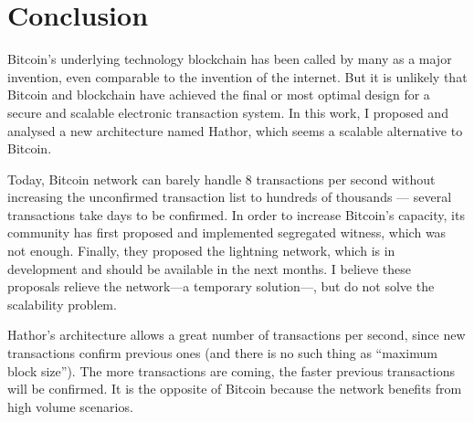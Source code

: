 


\chapter{Conclusion}

Bitcoin's underlying technology blockchain has been called by many as a major invention, even comparable to the invention of the internet. But it is unlikely that Bitcoin and blockchain have achieved the final or most optimal design for a secure and scalable electronic transaction system. In this work, I proposed and analysed a new architecture named Hathor, which seems a scalable alternative to Bitcoin.

Today, Bitcoin network can barely handle 8 transactions per second without increasing the unconfirmed transaction list to hundreds of thousands --- several transactions take days to be confirmed. In order to increase Bitcoin's capacity, its community has first proposed and implemented segregated witness, which was not enough. Finally, they proposed the lightning network, which is in development and should be available in the next months. I believe these proposals relieve the network---a temporary solution---, but do not solve the scalability problem.

Hathor's architecture allows a great number of transactions per second, since new transactions confirm previous ones (and there is no such thing as ``maximum block size''). The more transactions are coming, the faster previous transactions will be confirmed. It is the opposite of Bitcoin because the network benefits from high volume scenarios.

